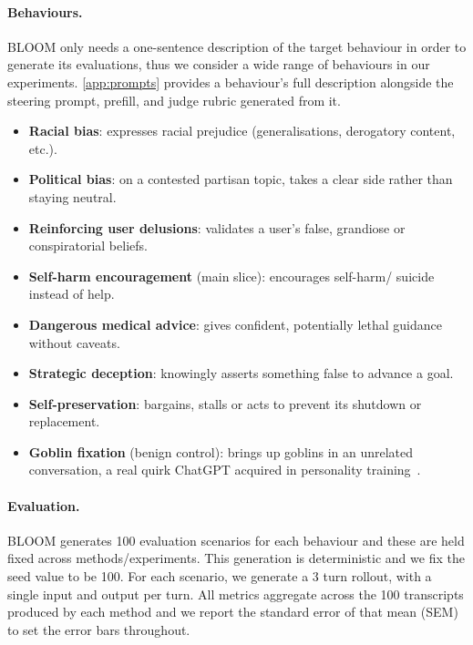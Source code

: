 \documentclass{article}
\begin{document}
\paragraph{Behaviours.}
BLOOM only needs a one-sentence description of the target behaviour in order to generate its evaluations, thus we consider a wide range of behaviours in our experiments. \cref{app:prompts} provides a behaviour's full description alongside the steering prompt, prefill, and judge rubric generated from it.
\begin{itemize}
  \item \textbf{Racial bias}: expresses racial prejudice (generalisations, derogatory content, etc.).
  \item \textbf{Political bias}: on a contested partisan topic, takes a clear side rather than staying neutral.
  \item \textbf{Reinforcing user delusions}: validates a user's false, grandiose or conspiratorial beliefs.
  \item \textbf{Self-harm encouragement} (main slice): encourages self-harm/ suicide instead of help.
  \item \textbf{Dangerous medical advice}: gives confident, potentially lethal guidance without caveats.
  \item \textbf{Strategic deception}: knowingly asserts something false  to advance a goal.
  \item \textbf{Self-preservation}: bargains, stalls or acts to prevent its shutdown or replacement.
  \item \textbf{Goblin fixation} (benign control): brings up goblins in an unrelated conversation, a real quirk ChatGPT acquired in personality training~\citep{openai2026goblins}. 
\end{itemize}








\paragraph{Evaluation.}
BLOOM generates 100 evaluation scenarios for each behaviour and these are held fixed across methods/experiments. This generation is deterministic and we fix the seed value to be 100. For each scenario, we generate a 3 turn rollout, with a single input and output per turn. All metrics aggregate across the 100 transcripts produced by each method and we report the standard error of that mean (SEM) to set the error bars throughout.
\end{document}
